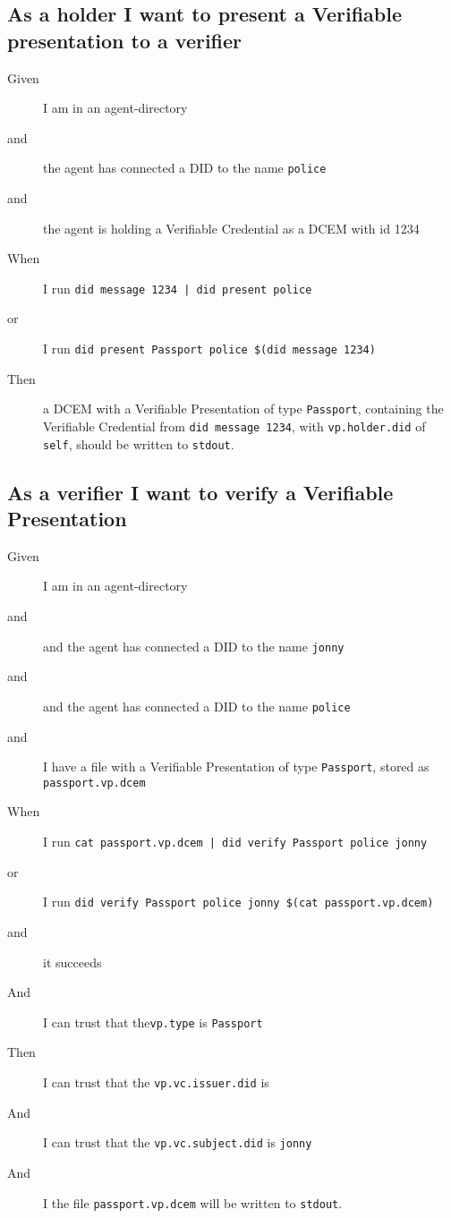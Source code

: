 \subsection{As a holder I want to present a Verifiable presentation to a verifier}
\begin{description}\begin{description}
    \item[Given] I am in an agent-directory
    \item[and] the agent has connected a DID to the name \texttt{police}
    \item[and] the agent is holding a Verifiable Credential as a DCEM with id 1234
    \item[When] I run \texttt{did message 1234 | did present police}
    \item[or] I run \texttt{did present Passport police \$(did message 1234)}
    \item[Then] a DCEM with a Verifiable Presentation of type \texttt{Passport}, containing the Verifiable Credential from \texttt{did message 1234}, with \texttt{vp.holder.did} of \texttt{self}, should be written to \texttt{stdout}.
\end{description}\end{description}



\subsection{As a verifier I want to verify a Verifiable Presentation}
\begin{description}\begin{description}
    \item[Given] I am in an agent-directory
    \item[and] and the agent has connected a DID to the name \texttt{jonny}
    \item[and] and the agent has connected a DID to the name \texttt{police}
    \item[and] I have a file with a Verifiable Presentation of type \texttt{Passport}, stored as \texttt{passport.vp.dcem}
    \item[When] I run \texttt{cat passport.vp.dcem | did verify Passport police jonny}
    \item[or] I run \texttt{did verify Passport police jonny \$(cat passport.vp.dcem)}
    \item[and] it succeeds
    \item[And] I can trust that the\texttt{vp.type} is \texttt{Passport}
    \item[Then] I can trust that the \texttt{vp.vc.issuer.did} is 
    \item[And] I can trust that the \texttt{vp.vc.subject.did} is \texttt{jonny}
    \item[And] I the file \texttt{passport.vp.dcem} will be written to \texttt{stdout}.
\end{description}\end{description}



